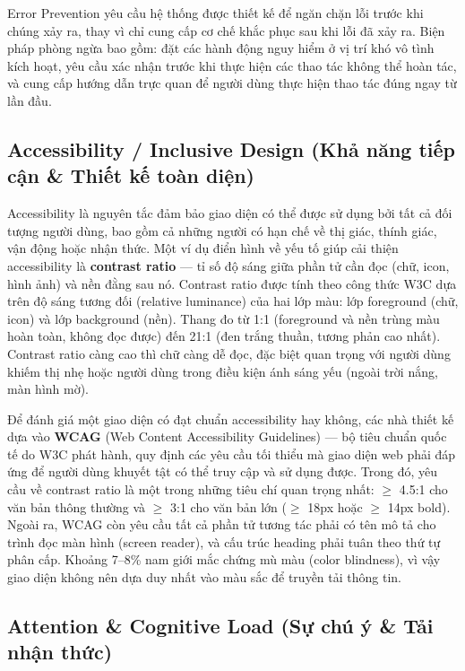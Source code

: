 Error Prevention yêu cầu hệ thống được thiết kế để ngăn chặn lỗi trước khi chúng xảy ra, thay vì chỉ cung cấp cơ chế khắc phục sau khi lỗi đã xảy ra. Biện pháp phòng ngừa bao gồm: đặt các hành động nguy hiểm ở vị trí khó vô tình kích hoạt, yêu cầu xác nhận trước khi thực hiện các thao tác không thể hoàn tác, và cung cấp hướng dẫn trực quan để người dùng thực hiện thao tác đúng ngay từ lần đầu.

\subsection{Accessibility / Inclusive Design (Khả năng tiếp cận \& Thiết kế toàn diện)}

Accessibility là nguyên tắc đảm bảo giao diện có thể được sử dụng bởi tất cả đối tượng người dùng, bao gồm cả những người có hạn chế về thị giác, thính giác, vận động hoặc nhận thức. Một ví dụ điển hình về yếu tố giúp cải thiện accessibility là \textbf{contrast ratio} --- tỉ số độ sáng giữa phần tử cần đọc (chữ, icon, hình ảnh) và nền đằng sau nó. Contrast ratio được tính theo công thức W3C dựa trên độ sáng tương đối (relative luminance) của hai lớp màu: lớp foreground (chữ, icon) và lớp background (nền). Thang đo từ 1:1 (foreground và nền trùng màu hoàn toàn, không đọc được) đến 21:1 (đen trắng thuần, tương phản cao nhất). Contrast ratio càng cao thì chữ càng dễ đọc, đặc biệt quan trọng với người dùng khiếm thị nhẹ hoặc người dùng trong điều kiện ánh sáng yếu (ngoài trời nắng, màn hình mờ).

Để đánh giá một giao diện có đạt chuẩn accessibility hay không, các nhà thiết kế dựa vào \textbf{WCAG} (Web Content Accessibility Guidelines) --- bộ tiêu chuẩn quốc tế do W3C phát hành, quy định các yêu cầu tối thiểu mà giao diện web phải đáp ứng để người dùng khuyết tật có thể truy cập và sử dụng được. Trong đó, yêu cầu về contrast ratio là một trong những tiêu chí quan trọng nhất: $\geq$ 4.5:1 cho văn bản thông thường và $\geq$ 3:1 cho văn bản lớn ($\geq$ 18px hoặc $\geq$ 14px bold). Ngoài ra, WCAG còn yêu cầu tất cả phần tử tương tác phải có tên mô tả cho trình đọc màn hình (screen reader), và cấu trúc heading phải tuân theo thứ tự phân cấp. Khoảng 7--8\% nam giới mắc chứng mù màu (color blindness), vì vậy giao diện không nên dựa duy nhất vào màu sắc để truyền tải thông tin.

\subsection{Attention \& Cognitive Load (Sự chú ý \& Tải nhận thức)}

